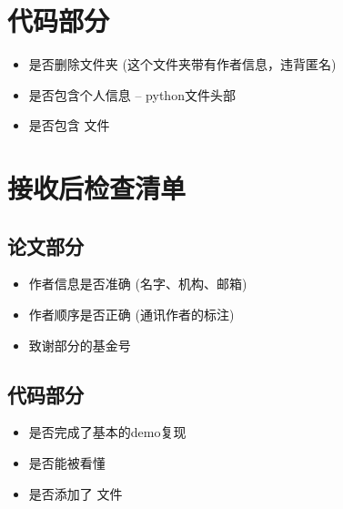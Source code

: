 \documentclass[letterpaper,12pt,english]{sphinxhowto}
\begin{document}
\section{代码部分}
\label{\detokenize{mds/checklist:id3}}\begin{itemize}
\item {} 
\sphinxAtStartPar
 是否删除文件夹 (这个文件夹带有作者信息，违背匿名)

\item {} 
\sphinxAtStartPar
 是否包含个人信息 – python文件头部

\item {} 
\sphinxAtStartPar
 是否包含  文件

\end{itemize}


\section{接收后检查清单}
\label{\detokenize{mds/checklist:id4}}

\subsection{论文部分}
\label{\detokenize{mds/checklist:id5}}\begin{itemize}
\item {} 
\sphinxAtStartPar
 作者信息是否准确 (名字、机构、邮箱)

\item {} 
\sphinxAtStartPar
 作者顺序是否正确 (通讯作者的标注)

\item {} 
\sphinxAtStartPar
 致谢部分的基金号

\end{itemize}


\subsection{代码部分}
\label{\detokenize{mds/checklist:id6}}\begin{itemize}
\item {} 
\sphinxAtStartPar
 是否完成了基本的demo复现

\item {} 
\sphinxAtStartPar
  是否能被看懂

\item {} 
\sphinxAtStartPar
 是否添加了 文件

\end{itemize}



\renewcommand{\indexname}{索引}
\footnotesize\raggedright\printindex
\end{document}
